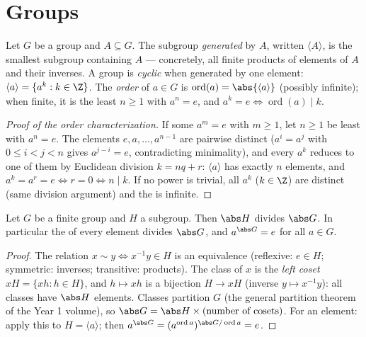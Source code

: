 \section{Groups}

\begin{definition}\label{def:b2:structures:generated}
Let $G$ be a group and $A \subseteq G$. The subgroup \emph{generated}
by $A$, written $\langle A \rangle$, is the smallest subgroup
containing $A$ --- concretely, all finite products of elements of $A$
and their inverses. A group is \emph{cyclic} when
generated by one element: $\langle a\rangle = \{a^k : k \in \Z\}$.
The \emph{order} of $a \in G$ is
$\operatorname{ord}(a) = \abs{\langle a \rangle}$ (possibly
infinite); when finite, it is the least $n \geq 1$ with $a^n = e$,
and $a^k = e \iff \operatorname{ord}(a) \mid k$.
\end{definition}

\begin{proof}[Proof of the order characterization]
If some $a^m = e$ with $m \geq 1$, let $n \geq 1$ be least with $a^n
= e$. The elements $e, a, \dots, a^{n-1}$ are pairwise distinct
($a^{i} = a^{j}$ with $0 \leq i < j < n$ gives $a^{j-i} = e$,
contradicting minimality), and every $a^k$ reduces to one of them by
Euclidean division $k = nq + r$: $\langle a\rangle$ has exactly $n$
elements, and $a^k = a^r = e \iff r = 0 \iff n \mid k$. If no power
is trivial, all $a^k$ ($k \in \Z$) are distinct (same division
argument) and the  is infinite.
\end{proof}

\begin{theorem}[Lagrange]\label{thm:b2:structures:lagrange}
Let $G$ be a finite group and $H$ a subgroup. Then $\abs H$ divides
$\abs G$. In particular the  of every
element divides $\abs G$, and $a^{\abs G} = e$ for all $a \in G$.
\end{theorem}

\begin{proof}
The relation $x \sim y \iff x^{-1}y \in H$ is an equivalence
(reflexive: $e \in H$; symmetric: inverses; transitive: products).
The class of $x$ is the \emph{left coset} $xH = \{xh : h \in H\}$,
and $h \mapsto xh$ is a bijection $H \to xH$ (inverse $y \mapsto
x^{-1}y$): all classes have $\abs H$ elements. Classes partition $G$
(the general partition theorem of the Year 1 volume), so $\abs G =
\abs H \times (\text{number of cosets})$. For an element: apply this
to $H = \langle a\rangle$; then $a^{\abs G} = (a^{\operatorname{ord}
a})^{\abs G / \operatorname{ord} a} = e$.
\end{proof}

